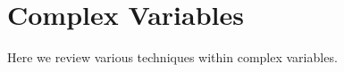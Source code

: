 \newpage
\chapter{Complex Variables}
\label{app:complex-vars}
Here we review various techniques within complex variables.

